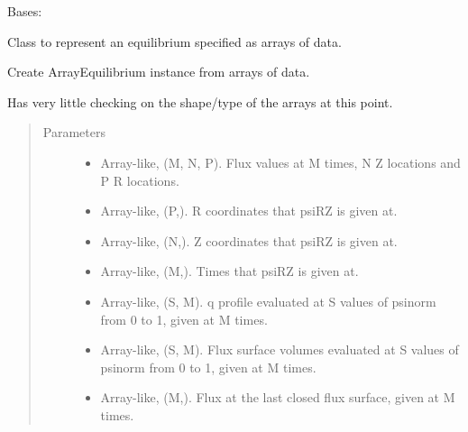 \documentclass[letterpaper,10pt,english]{sphinxmanual}
\begin{document}
\begin{fulllineitems}
\label{\detokenize{eqtools:eqtools.FromArrays.ArrayEquilibrium}}
Bases: {\hyperref[\detokenize{eqtools:eqtools.core.Equilibrium}]{}}

Class to represent an equilibrium specified as arrays of data.

Create ArrayEquilibrium instance from arrays of data.

Has very little checking on the shape/type of the arrays at this point.
\begin{quote}\begin{description}
\item[{Parameters}] \leavevmode\begin{itemize}
\item {} 
 \textendash{} Array-like, (M, N, P).
Flux values at M times, N Z locations and P R locations.

\item {} 
 \textendash{} Array-like, (P,).
R coordinates that psiRZ is given at.

\item {} 
 \textendash{} Array-like, (N,).
Z coordinates that psiRZ is given at.

\item {} 
 \textendash{} Array-like, (M,).
Times that psiRZ is given at.

\item {} 
 \textendash{} Array-like, (S, M).
q profile evaluated at S values of psinorm from 0 to 1, given at M
times.

\item {} 
 \textendash{} Array-like, (S, M).
Flux surface volumes evaluated at S values of psinorm from 0 to 1,
given at M times.

\item {} 
 \textendash{} Array-like, (M,).
Flux at the last closed flux surface, given at M times.


\end{itemize}
\end{description}
\end{quote}
\end{fulllineitems}
\end{document}
